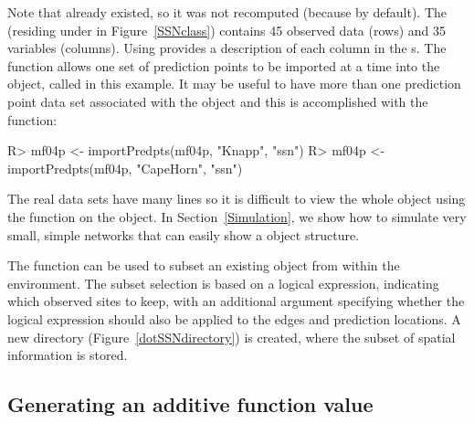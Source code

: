 \documentclass[nojss]{jss}
\renewenvironment{Schunk}{\vspace{\topsep}}{\vspace{\topsep}}
\begin{document}
Note that  already existed, so it was not recomputed
(because  by default). The 
 (residing under  in
Figure~\ref{SSNclass}) contains 45 observed data (rows) and 35
variables (columns). Using  provides a
description of each column in the 
s. The  function allows one set of
prediction points to be imported at a time into the
 object, called  in this
example. It may be useful to have more than one prediction point data
set associated with the  object and this is
accomplished with the  function:

\begin{Schunk}
\begin{Sinput}
R> mf04p <- importPredpts(mf04p, "Knapp", "ssn")
R> mf04p <- importPredpts(mf04p, "CapeHorn", "ssn")
\end{Sinput}
\end{Schunk}

The real data sets have many lines so it is difficult to view the
whole object using the  function on the
 object.  In Section~\ref{Simulation}, we
show how to simulate very small, simple networks that can easily show
a  object structure.

The  function can be used to subset an existing
 object from within the 
environment. The subset selection is based on a logical expression,
indicating which observed sites to keep, with an additional argument
specifying whether the logical expression should also be applied to
the edges and prediction locations. A new  directory
(Figure~\ref{dotSSNdirectory}) is created, where the subset of spatial
information is stored.


\subsection{Generating an additive function value}
\end{document}

